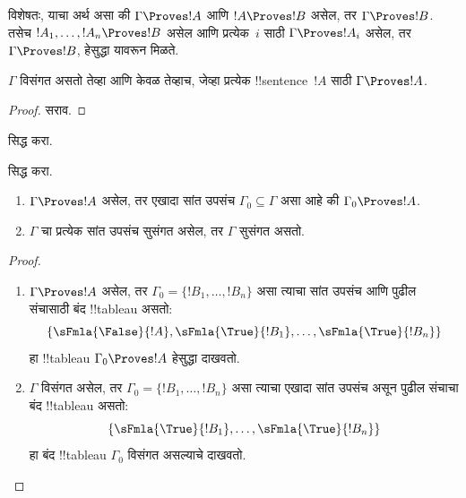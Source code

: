 \documentclass[../../../include/open-logic-section]{subfiles}
\begin{document}
विशेषतः, याचा अर्थ असा की $\Gamma \Proves !A$ आणि $!A
\Proves !B$ असेल, तर $\Gamma \Proves !B$. तसेच $!A_1,
\dots, !A_n \Proves !B$ असेल आणि प्रत्येक~$i$ साठी $\Gamma \Proves !A_i$
असेल, तर $\Gamma \Proves !B$, हेसुद्धा यावरून मिळते.

\begin{prop}
$\Gamma$ विसंगत असतो तेव्हा आणि केवळ तेव्हाच, जेव्हा प्रत्येक
  !!{sentence}~$!A$ साठी $\Gamma \Proves !A$.
\end{prop}

\begin{proof}
सराव.
\end{proof}

\begin{prob}
 सिद्ध करा.
\end{prob}
\tagendprob

\begin{prob}
 सिद्ध करा.
\end{prob}
\tagendprob

\begin{prop}[संहतता]
  \begin{enumerate}
  \item $\Gamma \Proves !A$ असेल, तर एखादा सांत उपसंच $\Gamma_0
    \subseteq \Gamma$ असा आहे की $\Gamma_0 \Proves !A$.
  \item $\Gamma$ चा प्रत्येक सांत उपसंच सुसंगत असेल, तर $\Gamma$ सुसंगत
    असतो.
  \end{enumerate}
\end{prop}

\begin{proof}
  \begin{enumerate}
    \item $\Gamma \Proves !A$ असेल, तर $\Gamma_0 =
      \{!B_1, \dots, !B_n\}$ असा त्याचा सांत उपसंच आणि पुढील संचासाठी बंद !!{tableau} असतो:
      \[
      \{\sFmla{\False}{!A}, \sFmla{\True}{!B_1}, \dots, \sFmla{\True}{!B_n}\}
      \]
      हा !!{tableau} $\Gamma_0 \Proves !A$ हेसुद्धा दाखवतो.
    \item $\Gamma$ विसंगत असेल, तर
      $\Gamma_0 = \{!B_1, \dots, !B_n\}$ असा त्याचा एखादा सांत उपसंच असून पुढील
      संचाचा बंद !!{tableau} असतो:
      \[
      \{\sFmla{\True}{!B_1}, \dots, \sFmla{\True}{!B_n}\}
      \]
      हा बंद !!{tableau} $\Gamma_0$ विसंगत असल्याचे दाखवतो.
  \end{enumerate}
\end{proof}
\end{document}
